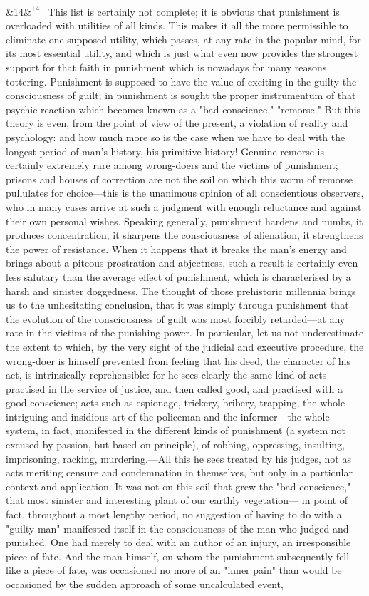 \documentclass[12pt]{article}
\newcommand{\para}[1][]{\par\noindent\ifx&#1&\else\textsuperscript{\footnotesize #1}~\fi}
\begin{document}
\para[14] This list is certainly not complete; it is obvious that punishment is overloaded with utilities of all kinds. This makes it all the more permissible to eliminate one supposed utility, which passes, at any rate in the popular mind, for its most essential utility, and which is just what even now provides the strongest support for that faith in punishment which is nowadays for many reasons tottering. Punishment is supposed to have the value of exciting in the guilty the consciousness of guilt; in punishment is sought the proper instrumentum of that psychic reaction which becomes known as a "bad conscience," "remorse." But this theory is even, from the point of view of the present, a violation of reality and psychology: and how much more so is the case when we have to deal with the longest period of man's history, his primitive history! Genuine remorse is certainly extremely rare among wrong-doers and the victims of punishment; prisons and houses of correction are not the soil on which this worm of remorse pullulates for choice---this is the unanimous opinion of all conscientious observers, who in many cases arrive at such a judgment with enough reluctance and against their own personal wishes. Speaking generally, punishment hardens and numbs, it produces concentration, it sharpens the consciousness of alienation, it strengthens the power of resistance. When it happens that it breaks the man's energy and brings about a piteous prostration and abjectness, such a result is certainly even less salutary than the average effect of punishment, which is characterised by a harsh and sinister doggedness. The thought of those prehistoric millennia brings us to the unhesitating conclusion, that it was simply through punishment that the evolution of the consciousness of guilt was most forcibly retarded---at any rate in the victims of the punishing power. In particular, let us not underestimate the extent to which, by the very sight of the judicial and executive procedure, the wrong-doer is himself prevented from feeling that his deed, the character of his act, is intrinsically reprehensible: for he sees clearly the same kind of acts practised in the service of justice, and then called good, and practised with a good conscience; acts such as espionage, trickery, bribery, trapping, the whole intriguing and insidious art of the policeman and the informer---the whole system, in fact, manifested in the different kinds of punishment (a system not excused by passion, but based on principle), of robbing, oppressing, insulting, imprisoning, racking, murdering.---All this he sees treated by his judges, not as acts meriting censure and condemnation in themselves, but only in a particular context and application. It was not on this soil that grew the "bad conscience," that most sinister and interesting plant of our earthly vegetation--- in point of fact, throughout a most lengthy period, no suggestion of having to do with a "guilty man" manifested itself in the consciousness of the man who judged and punished. One had merely to deal with an author of an injury, an irresponsible piece of fate. And the man himself, on whom the punishment subsequently fell like a piece of fate, was occasioned no more of an "inner pain" than would be occasioned by the sudden approach of some uncalculated event, 
\end{document}
